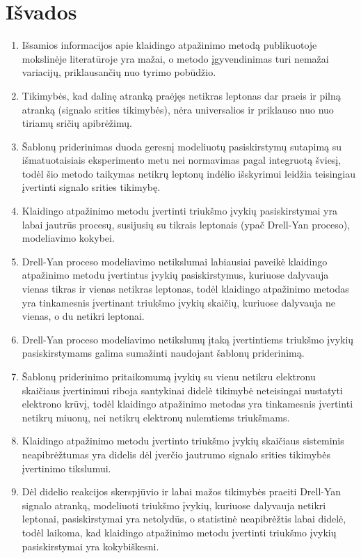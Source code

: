 \documentclass[a4paper, 12pt, oneside]{article}
\begin{document}
\section*{Išvados} 
\begin{enumerate}
	\item Išsamios informacijos apie klaidingo atpažinimo metodą publikuotoje mokslinėje literatūroje yra mažai, o metodo
	įgyvendinimas turi nemažai variacijų, priklausančių nuo tyrimo pobūdžio.
	\item Tikimybės, kad dalinę atranką praėjęs netikras leptonas dar praeis ir pilną atranką (signalo srities tikimybės),
	nėra universalios ir priklauso nuo nuo tiriamų sričių apibrėžimų.
	\item Šablonų priderinimas duoda geresnį modeliuotų pasiskirstymų sutapimą su išmatuotaisiais eksperimento metu 
	nei normavimas pagal integruotą šviesį, todėl šio metodo taikymas netikrų leptonų indėlio išskyrimui
	leidžia teisingiau įvertinti signalo srities tikimybę.
	\item Klaidingo atpažinimo metodu įvertinti triukšmo įvykių pasiskirstymai yra labai jautrūs procesų, susijusių su tikrais
	leptonais (ypač Drell-Yan proceso), modeliavimo kokybei.
	\item Drell-Yan proceso modeliavimo netikslumai labiausiai paveikė klaidingo atpažinimo metodu įvertintus įvykių pasiskirstymus,
	kuriuose dalyvauja vienas tikras ir vienas netikras leptonas, todėl klaidingo atpažinimo metodas yra tinkamesnis
	įvertinant triukšmo įvykių skaičių, kuriuose dalyvauja ne vienas, o du netikri leptonai.
	\item Drell-Yan proceso modeliavimo netikslumų įtaką įvertintiems triukšmo įvykių pasiskirstymams galima sumažinti naudojant
	šablonų priderinimą.
	\item Šablonų priderinimo pritaikomumą įvykių su vienu netikru elektronu skaičiaus įvertinimui riboja
	santykinai didelė tikimybė neteisingai nustatyti elektrono krūvį, todėl klaidingo atpažinimo metodas yra tinkamesnis
	įvertinti netikrų miuonų, nei netikrų elektronų nulemtiems triukšmams.
	\item Klaidingo atpažinimo metodu įvertinto triukšmo įvykių skaičiaus sisteminis neapibrėžtumas yra didelis dėl įverčio
	jautrumo signalo srities tikimybės įvertinimo tikslumui.
	\item Dėl didelio reakcijos skerspjūvio ir labai mažos tikimybės praeiti Drell-Yan signalo atranką, modeliuoti triukšmo
	įvykių, kuriuose dalyvauja netikri leptonai, pasiskirstymai yra netolydūs, o statistinė neapibrėžtis labai didelė,
	todėl laikoma, kad klaidingo atpažinimo metodu įvertinti triukšmo įvykių pasiskirstymai yra kokybiškesni. 
\end{enumerate}
\end{document}
